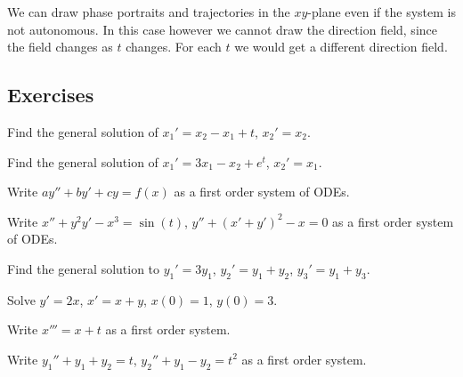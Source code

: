 \documentclass[12pt]{book}
\begin{document}
We can draw phase portraits and trajectories in the $xy$-plane
even if the system is not autonomous.  In this case however we cannot draw
the direction field, since the field changes as $t$ changes.  For
each $t$ we would get a different direction field.

\subsection{Exercises}

\begin{exercise}
Find the general solution of $x_1' = x_2 - x_1 + t$, $x_2' = x_2$.
\end{exercise}

\begin{exercise}
Find the general solution of $x_1' = 3 x_1 - x_2 + e^t$, $x_2' = x_1$.
\end{exercise}

\begin{exercise}
Write $ay'' + by' + cy = f(x)$
as a first order system of ODEs.
\end{exercise}

\begin{exercise}
Write $x'' + y^2 y' - x^3 = \sin(t)$, 
$y'' + {(x'+y')}^2 -x = 0$ as a first order system of ODEs.
\end{exercise}

\setcounter{exercise}{100}

\begin{exercise}
Find the general solution to $y_1' = 3 y_1$, $y_2' = y_1 + y_2$,
$y_3' = y_1 + y_3$.
\end{exercise}

\begin{exercise}
Solve $y'=2x$, $x'=x+y$, $x(0)=1$, $y(0)=3$.
\end{exercise}

\begin{exercise}
Write $x''' = x+t$ as a first order system.
\end{exercise}

\begin{exercise}
Write $y_1'' + y_1 + y_2 = t$, 
$y_2'' + y_1 - y_2 = t^2$ as a first order system.
\end{exercise}
\end{document}
